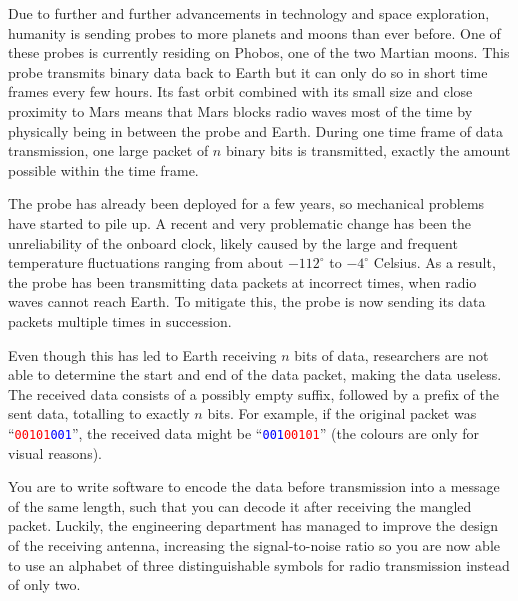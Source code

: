 \newcommand{\maxn}{10^5}


%
Due to further and further advancements in technology and space exploration, humanity is sending probes to more planets and moons than ever before.
One of these probes is currently residing on Phobos, one of the two Martian moons.
This probe transmits binary data back to Earth but it can only do so in short time frames every few hours.
Its fast orbit combined with its small size and close proximity to Mars means that Mars blocks radio waves most of the time by physically being in between the probe and Earth.
During one time frame of data transmission, one large packet of $n$ binary bits is transmitted, exactly the amount possible within the time frame.

The probe has already been deployed for a few years, so mechanical problems have started to pile up.
A recent and very problematic change has been the unreliability of the onboard clock, likely caused by the large and frequent temperature fluctuations ranging from about $-112^\circ$ to $-4^\circ$ Celsius.
As a result, the probe has been transmitting data packets at incorrect times, when radio waves cannot reach Earth.
To mitigate this, the probe is now sending its data packets multiple times in succession.

Even though this has led to Earth receiving $n$ bits of data, researchers are not able to determine the start and end of the data packet, making the data useless.
The received data consists of a possibly empty suffix, followed by a prefix of the sent data, totalling to exactly $n$ bits.
For example, if the original packet was ``\textcolor{red}{\texttt{00101}}\textcolor{blue}{\texttt{001}}'', the received data might be ``\textcolor{blue}{\texttt{001}}\textcolor{red}{\texttt{00101}}'' (the colours are only for visual reasons).

You are to write software to encode the data before transmission into a message of the same length, such that you can decode it after receiving the mangled packet.
Luckily, the engineering department has managed to improve the design of the receiving antenna, increasing the signal-to-noise ratio so you are now able to use an alphabet of three distinguishable symbols for radio transmission instead of only two.

